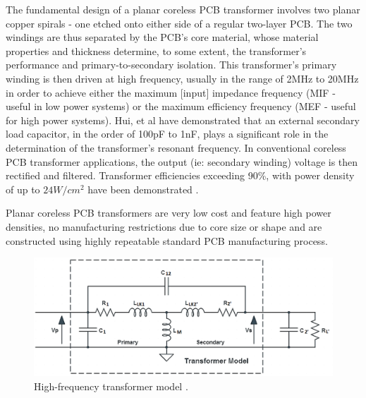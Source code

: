 \documentclass[conference]{IEEEtran}
\begin{document}
The fundamental design of a planar coreless PCB transformer involves two planar copper spirals - one etched onto either side of a regular two-layer PCB.  The two windings are thus separated by the PCB's core material, whose material properties and thickness determine, to some extent, the transformer's performance and primary-to-secondary isolation.  This transformer's primary winding is then driven at high frequency, usually in the range of 2MHz to 20MHz in order to achieve either the maximum [input] impedance frequency (MIF - useful in low power systems) or the maximum efficiency frequency (MEF - useful for high power systems).  Hui, et al \cite{TangHuiFundamental} have demonstrated that an external secondary load capacitor, in the order of 100pF to 1nF, plays a significant role in the determination of the transformer's resonant frequency.  In conventional coreless PCB transformer applications, the output (ie: secondary winding) voltage is then rectified and filtered.  Transformer efficiencies exceeding 90\%, with power density of up to $ 24W/cm^{2} $ have been demonstrated \cite{TangHuiFundamental}.

Planar coreless PCB transformers are very low cost and feature high power densities, no manufacturing restrictions due to core size or shape and are constructed using highly repeatable standard PCB manufacturing process. 

\begin{figure}[t]
	\centering
	\includegraphics[width=1\columnwidth]{./img/HF_Model}
	\caption{High-frequency transformer model \cite{TangHuiFundamental}.}
	\label{fig:HF-Model}
\end{figure}
\end{document}
